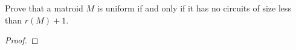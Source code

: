 \prob
{
    Prove that a matroid $M$ is uniform if and only if it has no circuits of size less than
    $r(M) + 1$.
}
\begin{proof}
\end{proof}